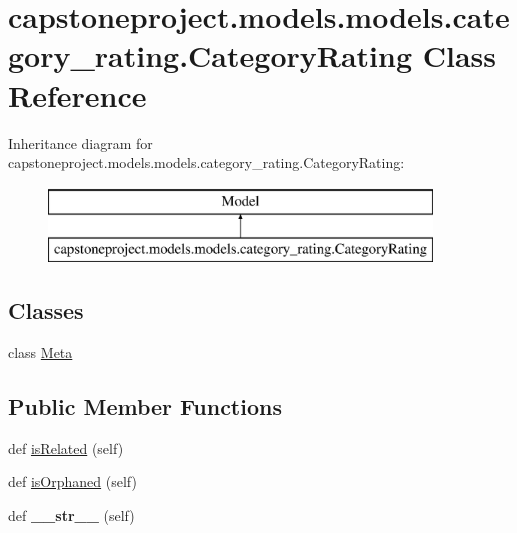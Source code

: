 \hypertarget{classcapstoneproject_1_1models_1_1models_1_1category__rating_1_1_category_rating}{}\section{capstoneproject.\+models.\+models.\+category\+\_\+rating.\+Category\+Rating Class Reference}
\label{classcapstoneproject_1_1models_1_1models_1_1category__rating_1_1_category_rating}
Inheritance diagram for capstoneproject.\+models.\+models.\+category\+\_\+rating.\+Category\+Rating\+:\begin{figure}[H]
\begin{center}
\leavevmode
\includegraphics[height=2.000000cm]{classcapstoneproject_1_1models_1_1models_1_1category__rating_1_1_category_rating}
\end{center}
\end{figure}
\subsection*{Classes}
\begin{DoxyCompactItemize}
\item 
class \mbox{\hyperlink{classcapstoneproject_1_1models_1_1models_1_1category__rating_1_1_category_rating_1_1_meta}{Meta}}
\end{DoxyCompactItemize}
\subsection*{Public Member Functions}
\begin{DoxyCompactItemize}
\item 
def \mbox{\hyperlink{classcapstoneproject_1_1models_1_1models_1_1category__rating_1_1_category_rating_a0afae26c13f68f41b87ac049236f18b0}{is\+Related}} (self)
\item 
def \mbox{\hyperlink{classcapstoneproject_1_1models_1_1models_1_1category__rating_1_1_category_rating_ab343d7f84b5da012d78ae10091aad8d9}{is\+Orphaned}} (self)
\item 
\mbox{\label{classcapstoneproject_1_1models_1_1models_1_1category__rating_1_1_category_rating_aefea4096d31125e128118a1f1199da69}} 
def {\bfseries \+\_\+\+\_\+str\+\_\+\+\_\+} (self)
\end{DoxyCompactItemize}
